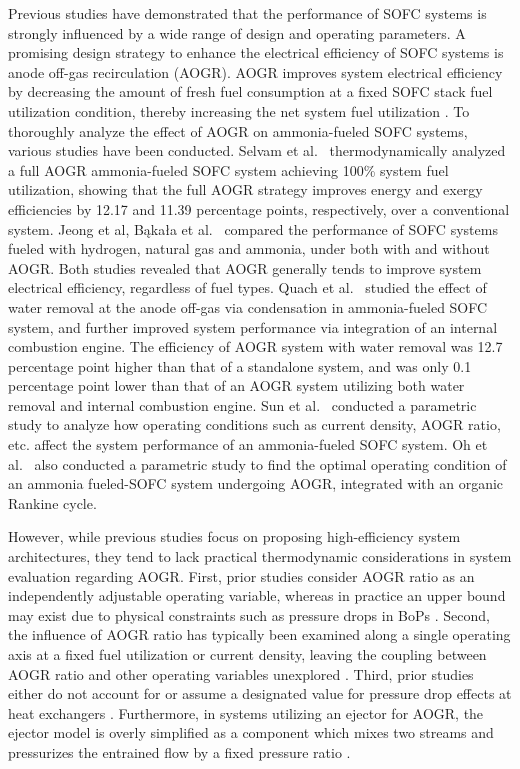 \documentclass[a4paper,10pt]{cas-dc} %
\begin{document}
Previous studies have demonstrated that the performance of SOFC systems is strongly influenced by a wide range of design and operating parameters.
A promising design strategy to enhance the electrical efficiency of SOFC systems is anode off-gas recirculation (AOGR).
AOGR improves system electrical efficiency by decreasing the amount of fresh fuel consumption at a fixed SOFC stack fuel utilization condition, thereby increasing the net system fuel utilization \cite{TORII2016229}.
To thoroughly analyze the effect of AOGR on ammonia-fueled SOFC systems, various studies have been conducted.
Selvam et al.~\cite{SELVAM2021114839} thermodynamically analyzed a full AOGR ammonia-fueled SOFC system achieving 100\% system fuel utilization, showing that the full AOGR strategy improves energy and exergy efficiencies by 12.17 and 11.39 percentage points, respectively, over a conventional system.
Jeong et al, Bąkała et al.~\cite{JEONG2026101799,BAKALA2024952} compared the performance of SOFC systems fueled with hydrogen, natural gas and ammonia, under both with and without AOGR.
Both studies revealed that AOGR generally tends to improve system electrical efficiency, regardless of fuel types.
Quach et al.~\cite{QUACH2022119718} studied the effect of water removal at the anode off-gas via condensation in ammonia-fueled SOFC system, and further improved system performance via integration of an internal combustion engine.
The efficiency of AOGR system with water removal was 12.7 percentage point higher than that of a standalone system, and was only 0.1 percentage point lower than that of an AOGR system utilizing both water removal and internal combustion engine.
Sun et al.~\cite{SUN2023117804} conducted a parametric study to analyze how operating conditions such as current density, AOGR ratio, etc. affect the system performance of an ammonia-fueled SOFC system.
Oh et al.~\cite{OH2024235241} also conducted a parametric study to find the optimal operating condition of an ammonia fueled-SOFC system undergoing AOGR, integrated with an organic Rankine cycle.

However, while previous studies focus on proposing high-efficiency system architectures, they tend to lack practical thermodynamic considerations in system evaluation regarding AOGR.
First, prior studies consider AOGR ratio as an independently adjustable operating variable, whereas in practice an upper bound may exist due to physical constraints such as pressure drops in BoPs \cite{SELVAM2021114839, QUACH2022119718, SUN2023117804, OH2024235241}.
Second, the influence of AOGR ratio has typically been examined along a single operating axis at a fixed fuel utilization or current density, leaving the coupling between AOGR ratio and other operating variables unexplored \cite{QUACH2022119718, SUN2023117804, OH2024235241}.
Third, prior studies either do not account for or assume a designated value for pressure drop effects at heat exchangers \cite{SELVAM2021114839, BAKALA2024952, QUACH2022119718, SUN2023117804, OH2024235241}.
Furthermore, in systems utilizing an ejector for AOGR, the ejector model is overly simplified as a component which mixes two streams and pressurizes the entrained flow by a fixed pressure ratio \cite{SUN2023117804}.
\end{document}
